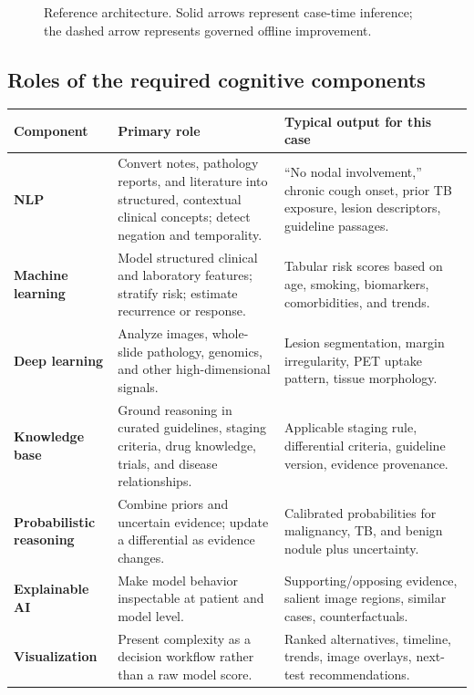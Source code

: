 \documentclass[11pt,a4paper]{article}
\begin{document}
\begin{figure}[ht]
{}
\caption{Reference architecture. Solid arrows represent case-time inference; the dashed arrow represents governed offline improvement.}
\end{figure}

\subsection{Roles of the required cognitive components}

\begin{tabularx}{\textwidth}{>{\bfseries\color{blue}}p{27mm} X X}
\toprule
Component & Primary role & Typical output for this case\\
\midrule
NLP & Convert notes, pathology reports, and literature into structured, contextual clinical concepts; detect negation and temporality. & ``No nodal involvement,'' chronic cough onset, prior TB exposure, lesion descriptors, guideline passages.\\
Machine learning & Model structured clinical and laboratory features; stratify risk; estimate recurrence or response. & Tabular risk scores based on age, smoking, biomarkers, comorbidities, and trends.\\
Deep learning & Analyze images, whole-slide pathology, genomics, and other high-dimensional signals. & Lesion segmentation, margin irregularity, PET uptake pattern, tissue morphology.\\
Knowledge base & Ground reasoning in curated guidelines, staging criteria, drug knowledge, trials, and disease relationships. & Applicable staging rule, differential criteria, guideline version, evidence provenance.\\
Probabilistic reasoning & Combine priors and uncertain evidence; update a differential as evidence changes. & Calibrated probabilities for malignancy, TB, and benign nodule plus uncertainty.\\
Explainable AI & Make model behavior inspectable at patient and model level. & Supporting/opposing evidence, salient image regions, similar cases, counterfactuals.\\
Visualization & Present complexity as a decision workflow rather than a raw model score. & Ranked alternatives, timeline, trends, image overlays, next-test recommendations.\\
\bottomrule
\end{tabularx}
\end{document}
